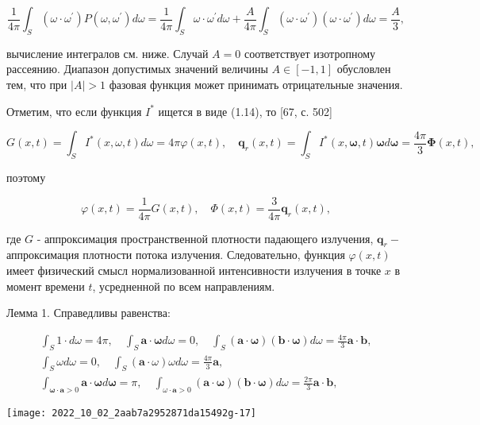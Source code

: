 \documentclass[10pt]{article}
\begin{document}
$$
\frac{1}{4 \pi} \int_{S}\left(\omega \cdot \omega^{\prime}\right) P\left(\omega, \omega^{\prime}\right) d \omega=\frac{1}{4 \pi} \int_{S} \omega \cdot \omega^{\prime} d \omega+\frac{A}{4 \pi} \int_{S}\left(\omega \cdot \omega^{\prime}\right)\left(\omega \cdot \omega^{\prime}\right) d \omega=\frac{A}{3},
$$

вычисление интегралов см. ниже. Случай $A=0$ соответствует изотропному рассеянию. Диапазон допустимых значений величины $A \in[-1,1]$ обусловлен тем, что при $|A|>1$ фазовая функция может принимать отрицательные значения.

Отметим, что если функция $I^{*}$ ищется в виде (1.14), то [67, с. 502]

$$
G(x, t)=\int_{S} I^{*}(x, \omega, t) d \omega=4 \pi \varphi(x, t), \quad \mathbf{q}_{r}(x, t)=\int_{S} I^{*}(x, \boldsymbol{\omega}, t) \boldsymbol{\omega} d \boldsymbol{\omega}=\frac{4 \pi}{3} \boldsymbol{\Phi}(x, t),
$$

поэтому

$$
\varphi(x, t)=\frac{1}{4 \pi} G(x, t), \quad \Phi(x, t)=\frac{3}{4 \pi} \mathbf{q}_{r}(x, t),
$$

где $G$ - аппроксимация пространственной плотности падающего излучения, $\mathbf{q}_{r}-$ аппроксимация плотности потока излучения. Следовательно, функция $\varphi(x, t)$ имеет физический смысл нормализованной интенсивности излучения в точке $x$ в момент времени $t$, усредненной по всем направлениям.

Лемма 1. Справедливы равенства:

$$
\begin{gathered}
\int_{S} 1 \cdot d \omega=4 \pi, \quad \int_{S} \mathbf{a} \cdot \boldsymbol{\omega} d \omega=0, \quad \int_{S}(\mathbf{a} \cdot \boldsymbol{\omega})(\mathbf{b} \cdot \boldsymbol{\omega}) d \omega=\frac{4 \pi}{3} \mathbf{a} \cdot \mathbf{b}, \\
\int_{S} \omega d \omega=0, \quad \int_{S}(\mathbf{a} \cdot \omega) \omega d \omega=\frac{4 \pi}{3} \mathbf{a}, \\
\int_{\boldsymbol{\omega} \cdot \mathbf{a}>0} \mathbf{a} \cdot \boldsymbol{\omega} d \boldsymbol{\omega}=\pi, \quad \int_{\omega \cdot \mathbf{a}>0}(\mathbf{a} \cdot \boldsymbol{\omega})(\mathbf{b} \cdot \boldsymbol{\omega}) d \omega=\frac{2 \pi}{3} \mathbf{a} \cdot \mathbf{b},
\end{gathered}
$$

\begin{center}
\texttt{[image: 2022\_10\_02\_2aab7a2952871da15492g-17]}
\end{center}
\end{document}
